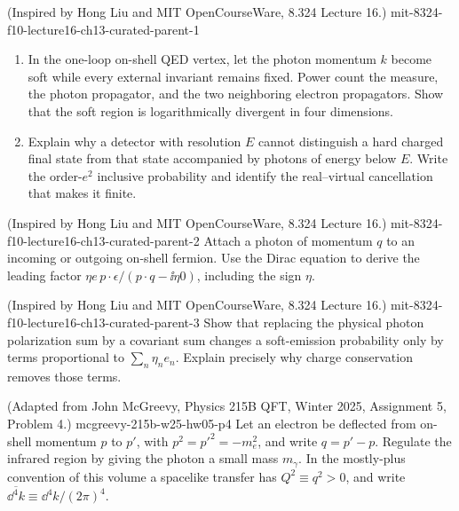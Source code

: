 
\begin{enumerate}
  {(Inspired by Hong Liu and MIT OpenCourseWare, 8.324 Lecture 16.)}
  {mit-8324-f10-lecture16-ch13-curated-parent-1}
\begin{enumerate}
\item
In the one-loop on-shell QED vertex, let the photon momentum \(k\) become
soft while every external invariant remains fixed.  Power count the measure,
the photon propagator, and the two neighboring electron propagators.  Show
that the soft region is logarithmically divergent in four dimensions.
\item
Explain why a detector with resolution \(E\) cannot distinguish a hard
charged final state from that state accompanied by photons of energy below
\(E\).  Write the order-\(e^2\) inclusive probability and identify the
real--virtual cancellation that makes it finite.
\end{enumerate}

  {(Inspired by Hong Liu and MIT OpenCourseWare, 8.324 Lecture 16.)}
  {mit-8324-f10-lecture16-ch13-curated-parent-2}
Attach a photon of momentum \(q\) to an incoming or outgoing on-shell
fermion.  Use the Dirac equation to derive the leading factor
\(\eta e\,p\cdot\epsilon/(p\cdot q-\ii\eta0)\), including the sign \(\eta\).

  {(Inspired by Hong Liu and MIT OpenCourseWare, 8.324 Lecture 16.)}
  {mit-8324-f10-lecture16-ch13-curated-parent-3}
Show that replacing the physical photon polarization sum by a covariant
sum changes a soft-emission probability only by terms proportional to
\(\sum_n\eta_ne_n\).  Explain precisely why charge conservation removes
those terms.

  {(Adapted from John McGreevy, Physics 215B QFT, Winter 2025,
  Assignment 5, Problem 4.)}
  {mcgreevy-215b-w25-hw05-p4}
Let an electron be deflected from on-shell momentum \(p\) to \(p'\), with
\(p^2=p'^2=-m_e^2\), and write \(q=p'-p\).  Regulate the infrared region by
giving the photon a small mass \(m_\gamma\).  In the mostly-plus convention
of this volume a spacelike transfer has \(Q^2\equiv q^2>0\), and write
\(\overline{\dd^4k}\equiv \dd^4k/(2\pi)^4\).


\end{enumerate}
